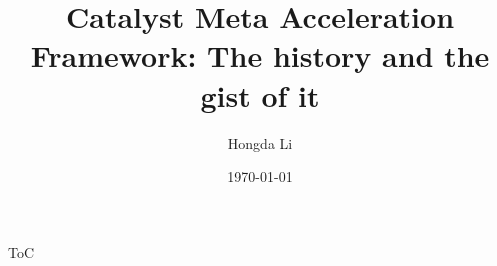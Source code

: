 \documentclass[11pt]{beamer}
\author{Hongda Li}
\title[Catalyst Acceleration]{Catalyst Meta Acceleration Framework: The history and the gist of it}
\institute[]{UBC Okanagan}
\date{\today}
\begin{document}
\begin{frame}
    \titlepage
\end{frame}

\begin{frame}{ToC}
    \begin{multicols}{2}
        \tableofcontents
    \end{multicols}
\end{frame}

\end{document}
